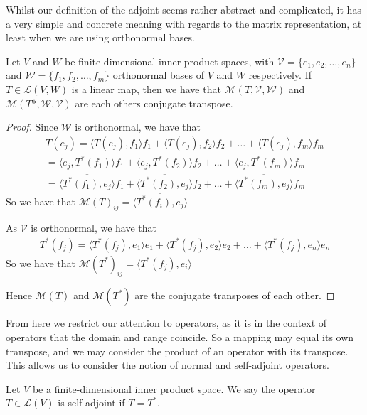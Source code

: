 \documentclass[]{article}
\begin{document}
Whilst our definition of the adjoint seems rather abstract and complicated, it has a very simple and concrete meaning with regards to the matrix representation, at least when we are using orthonormal bases.

\begin{thm} 
		Let $V$ and $W$ be finite-dimensional inner product spaces, with $\mathcal{V} = \{e_1, e_2, \ldots, e_n\}$ and $\mathcal{W} = \{f_1, f_2, \ldots, f_m\}$ orthonormal bases of $V$ and $W$ respectively. If $T \in \mathcal{L}(V,W)$ is a linear map, then we have that $\mathcal{M}(T,\mathcal{V},\mathcal{W})$ and $\mathcal{M}(T*,\mathcal{W},\mathcal{V})$ are each others conjugate transpose.
\end{thm}

\begin{proof}
	Since $\mathcal{W}$ is orthonormal, we have that
	\begin{align*}
			T(e_j) = \langle T(e_j), f_1 \rangle f_1 + \langle T(e_j), f_2 \rangle f_2 + \ldots + \langle T(e_j), f_m \rangle f_m \\
			= \langle e_j, T^*(f_1) \rangle f_1 + \langle e_j, T^*(f_2) \rangle f_2 + \ldots + \langle e_j, T^*(f_m) \rangle f_m \\
			= \overline{\langle T^*(f_1), e_j \rangle} f_1 + \overline{\langle T^*(f_2), e_j \rangle} f_2 + \ldots + \overline{\langle T^*(f_m), e_j \rangle } f_m
	\end{align*}
	So we have that $\mathcal{M}(T)_{ij} = \overline{\langle T^*(f_i), e_j \rangle }$

	As $\mathcal{V}$ is orthonormal, we have that
	\begin{align*}
			T^*(f_j) = \langle T^*(f_j), e_1 \rangle e_1 + \langle T^*(f_j), e_2 \rangle e_2 + \ldots + \langle T^*(f_j), e_n \rangle e_n
	\end{align*}
	So we have that $\mathcal{M}(T^*)_{ij} = \langle T^*(f_j), e_i \rangle $

	Hence $\mathcal{M}(T)$ and $\mathcal{M}(T^*)$ are the conjugate transposes of each other.
\end{proof}

From here we restrict our attention to operators, as it is in the context of operators that the domain and range coincide. So a mapping may equal its own transpose, and we may consider the product of an operator with its transpose. This allows us to consider the notion of normal and self-adjoint operators.

\begin{defi} 
		Let $V$ be a finite-dimensional inner product space. We say the operator $T \in \mathcal{L}(V)$ is self-adjoint if $T = T^*$.	
\end{defi}
\end{document}
